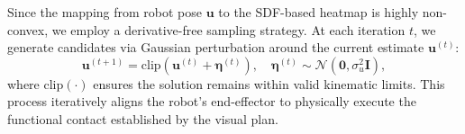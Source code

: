 \documentclass[letterpaper, 10 pt, conference]{ieeeconf}  %
\begin{document}
Since the mapping from robot pose $\mathbf{u}$ to the SDF-based heatmap is highly non-convex, we employ a derivative-free sampling strategy. At each iteration $t$, we generate candidates via Gaussian perturbation around the current estimate $\mathbf{u}^{(t)}$:
\begin{equation}
\mathbf{u}^{(t+1)} = \mathrm{clip}\!\left(\mathbf{u}^{(t)}+\boldsymbol{\eta}^{(t)}\right), \quad \boldsymbol{\eta}^{(t)}\sim\mathcal{N}(\mathbf{0},\sigma_u^2\mathbf{I}),
\label{eq:random_search}
\end{equation}
where $\mathrm{clip}(\cdot)$ ensures the solution remains within valid kinematic limits. This process iteratively aligns the robot's end-effector to physically execute the functional contact established by the visual plan.


\end{document}
